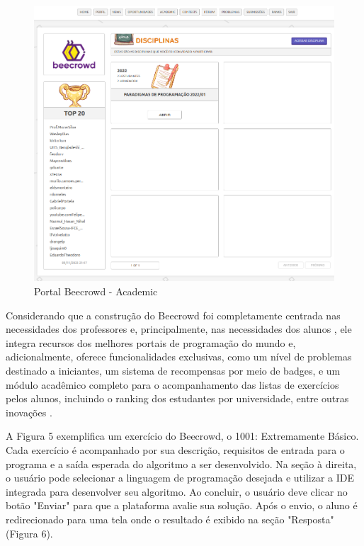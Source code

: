 \begin{figure}[h!]
	   \centering
            \caption{Portal Beecrowd - Academic}
            \label{fig:ModeloConceitual}
	   	\includegraphics[scale=0.3]{pictures/beecrowd_academic.png}
\end{figure}

Considerando que a construção do Beecrowd foi completamente centrada nas necessidades dos professores e, principalmente, nas necessidades dos alunos \cite[p.~239]{beztonin2014}, ele integra recursos dos melhores portais de programação do mundo e, adicionalmente, oferece funcionalidades exclusivas, como um nível de problemas destinado a iniciantes, um sistema de recompensas por meio de badges, e um módulo acadêmico completo para o acompanhamento das listas de exercícios pelos alunos, incluindo o ranking dos estudantes por universidade, entre outras inovações \cite[p.~239]{beztonin2014}.

A Figura 5 exemplifica um exercício do Beecrowd, o 1001: Extremamente Básico. Cada exercício é acompanhado por sua descrição, requisitos de entrada para o programa e a saída esperada do algoritmo a ser desenvolvido. Na seção à direita, o usuário pode selecionar a linguagem de programação desejada e utilizar a IDE integrada para desenvolver seu algoritmo. Ao concluir, o usuário deve clicar no botão "Enviar" para que a plataforma avalie sua solução. Após o envio, o aluno é redirecionado para uma tela onde o resultado é exibido na seção "Resposta" (Figura 6).

